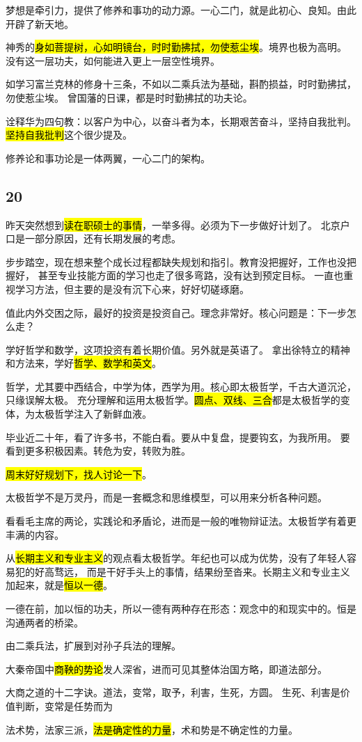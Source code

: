 梦想是牵引力，提供了修养和事功的动力源。一心二门，就是此初心、良知。由此开辟了新天地。

神秀的\hl{身如菩提树，心如明镜台，时时勤拂拭，勿使惹尘埃}。境界也极为高明。
没有这一层功夫，如何能进入更上一层空性境界。

如学习富兰克林的修身十三条，不如以二乘兵法为基础，斟酌损益，时时勤拂拭，勿使惹尘埃。
曾国藩的日课，都是时时勤拂拭的功夫论。

诠释华为四句教：以客户为中心，以奋斗者为本，长期艰苦奋斗，坚持自我批判。
\hl{坚持自我批判}这个很少提及。

\hrulefill

修养论和事功论是一体两翼，一心二门的架构。

\subsection{20}

昨天突然想到\hl{读在职硕士的事情}，一举多得。必须为下一步做好计划了。
北京户口是一部分原因，还有长期发展的考虑。

步步踏空，现在想来整个成长过程都缺失规划和指引。教育没把握好，工作也没把握好，
甚至专业技能方面的学习也走了很多弯路，没有达到预定目标。
一直也重视学习方法，但主要的是没有沉下心来，好好切磋琢磨。

值此内外交困之际，最好的投资是投资自己。理念非常好。核心问题是：下一步怎么走？

学好哲学和数学，这项投资有着长期价值。另外就是英语了。
拿出徐特立的精神和方法来，学好\hl{哲学、数学和英文}。

哲学，尤其要中西结合，中学为体，西学为用。核心即太极哲学，千古大道沉沦，只缘误解太极。
充分理解和运用太极哲学。\hl{圆点、双线、三合}都是太极哲学的变体，为太极哲学注入了新鲜血液。

毕业近二十年，看了许多书，不能白看。要从中复盘，提要钩玄，为我所用。
要看到更多积极因素。转危为安，转败为胜。

\hl{周末好好规划下，找人讨论一下}。

\hrulefill

太极哲学不是万灵丹，而是一套概念和思维模型，可以用来分析各种问题。

看看毛主席的两论，实践论和矛盾论，进而是一般的唯物辩证法。太极哲学有着更丰满的内容。

从\hl{长期主义和专业主义}的观点看太极哲学。年纪也可以成为优势，没有了年轻人容易犯的好高骛远，
而是干好手头上的事情，结果纷至沓来。长期主义和专业主义加起来，就是\hl{恒以一德}。

一德在前，加以恒的功夫，所以一德有两种存在形态：观念中的和现实中的。恒是沟通两者的桥梁。

\hrulefill

由二乘兵法，扩展到对孙子兵法的理解。

大秦帝国中\hl{商鞅的势论}发人深省，进而可见其整体治国方略，即道法部分。

大商之道的十二字诀。道法，变常，取予，利害，生死，方圆。
生死、利害是价值判断，变常是任势而为

法术势，法家三派，\hl{法是确定性的力量}，术和势是不确定性的力量。
